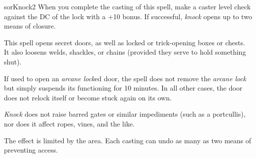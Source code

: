 \begin{spellcard}{sor}{Knock}{2}
  When you complete the casting of this spell, make a caster level check against the DC of the lock with a +10 bonus.
  If successful, \emph{knock} opens up to two means of closure.

  This spell opens secret doors, as well as locked or trick-opening boxes or chests.
  It also loosens welds, shackles, or chains (provided they serve to hold something shut).

  If used to open an \emph{arcane lock}ed door,
  the spell does not remove the \emph{arcane lock} but simply suspends its functioning for 10 minutes.
  In all other cases, the door does not relock itself or become stuck again on its own.

  \emph{Knock} does not raise barred gates or similar impediments (such as a portcullis),
  nor does it affect ropes, vines, and the like.

  The effect is limited by the area.
  Each casting can undo as many as two means of preventing access.

\end{spellcard}
